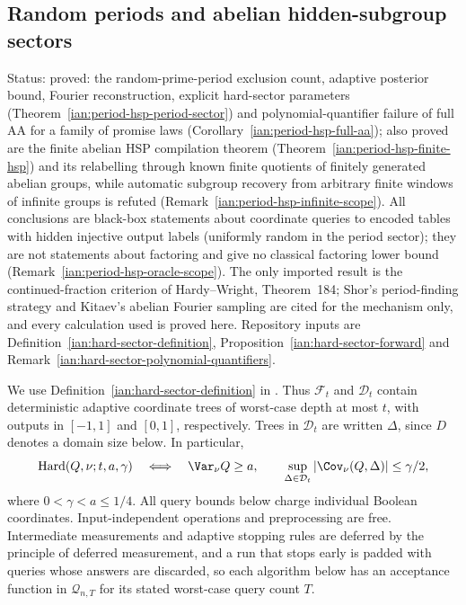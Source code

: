 \subsection{Random periods and abelian hidden-subgroup sectors}\label{ian:period-hsp-sectors}

Status: proved: the random-prime-period exclusion count, adaptive posterior bound, Fourier reconstruction, explicit hard-sector parameters (Theorem~\ref{ian:period-hsp-period-sector}) and polynomial-quantifier failure of full AA for a family of promise laws (Corollary~\ref{ian:period-hsp-full-aa}); also proved are the finite abelian HSP compilation theorem (Theorem~\ref{ian:period-hsp-finite-hsp}) and its relabelling through known finite quotients of finitely generated abelian groups, while automatic subgroup recovery from arbitrary finite windows of infinite groups is refuted (Remark~\ref{ian:period-hsp-infinite-scope}). All conclusions are black-box statements about coordinate queries to encoded tables with hidden injective output labels (uniformly random in the period sector); they are not statements about factoring and give no classical factoring lower bound (Remark~\ref{ian:period-hsp-oracle-scope}). The only imported result is the continued-fraction criterion of Hardy--Wright, Theorem~184; Shor's period-finding strategy and Kitaev's abelian Fourier sampling are cited for the mechanism only, and every calculation used is proved here. Repository inputs are Definition~\ref{ian:hard-sector-definition}, Proposition~\ref{ian:hard-sector-forward} and Remark~\ref{ian:hard-sector-polynomial-quantifiers}.

We use Definition~\ref{ian:hard-sector-definition} in
.
Thus \(\mathcal F_t\) and \(\mathcal D_t\) contain deterministic adaptive coordinate trees of worst-case depth at most \(t\), with outputs in \([-1,1]\) and \([0,1]\), respectively. Trees in \(\mathcal D_t\) are written \(\Delta\), since \(D\) denotes a domain size below. In particular,
\[
 \operatorname{Hard}(Q,\nu;t,a,\gamma)
 \quad\Longleftrightarrow\quad
 \Var_\nu Q\ge a,\qquad
 \sup_{\Delta\in\mathcal D_t}|\Cov_\nu(Q,\Delta)|\le\gamma/2,
\]
where \(0<\gamma<a\le1/4\).
All query bounds below charge individual Boolean coordinates. Input-independent operations and preprocessing are free. Intermediate measurements and adaptive stopping rules are deferred by the principle of deferred measurement, and a run that stops early is padded with queries whose answers are discarded, so each algorithm below has an acceptance function in \(\mathcal Q_{n,T}\) for its stated worst-case query count \(T\).

